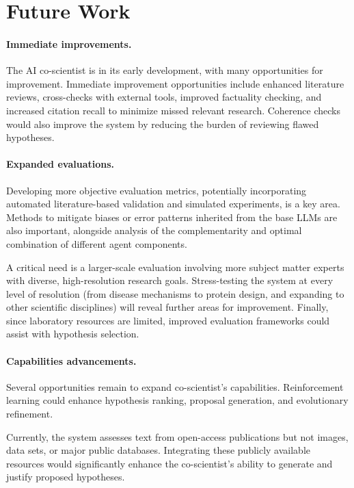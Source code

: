\vspace{-0.1cm}
\section{Future Work}
\vspace{-0.1cm}
\label{sec:future work}

\paragraph{Immediate improvements.}
The AI co-scientist is in its early development, with many opportunities for improvement. Immediate improvement opportunities include enhanced literature reviews, cross-checks with external tools, improved factuality checking, and increased citation recall to minimize missed relevant research. Coherence checks would also improve the system by reducing the burden of reviewing flawed hypotheses.

\paragraph{Expanded evaluations.}
Developing more objective evaluation metrics, potentially incorporating automated literature-based validation and simulated experiments, is a key area. Methods to mitigate biases or error patterns inherited from the base LLMs are also important, alongside analysis of the complementarity and optimal combination of different agent components.

A critical need is a larger-scale evaluation involving more subject matter experts with diverse, high-resolution research goals. Stress-testing the system at every level of resolution (from disease mechanisms to protein design, and expanding to other scientific disciplines) will reveal further areas for improvement. Finally, since laboratory resources are limited, improved evaluation frameworks could assist with hypothesis selection.

\paragraph{Capabilities advancements.}
Several opportunities remain to expand co-scientist's capabilities. Reinforcement learning could enhance hypothesis ranking, proposal generation, and evolutionary refinement.

Currently, the system assesses text from open-access publications but not images, data sets, or major public databases. Integrating these publicly available resources would significantly enhance the co-scientist's ability to generate and justify proposed hypotheses.

